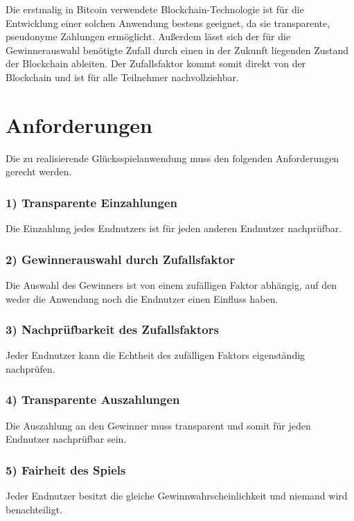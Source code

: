 \noindent Die erstmalig in Bitcoin verwendete Blockchain-Technologie ist für die Entwicklung einer solchen Anwendung bestens geeignet, da sie transparente, pseudonyme Zahlungen ermöglicht. Außerdem lässt sich der für die Gewinnerauswahl benötigte Zufall durch einen in der Zukunft liegenden Zustand der Blockchain ableiten. 
Der Zufallsfaktor kommt somit direkt von der Blockchain und ist für alle Teilnehmer nachvollziehbar.



\section{Anforderungen}\label{anforderungen}
Die zu realisierende Glücksspielanwendung muss den folgenden Anforderungen gerecht werden.
\subsubsection{1) Transparente Einzahlungen}
Die Einzahlung jedes Endnutzers ist für jeden anderen Endnutzer nachprüfbar.
\subsubsection{2) Gewinnerauswahl durch Zufallsfaktor}
Die Auswahl des Gewinners ist von einem zufälligen Faktor abhängig, auf den weder die Anwendung noch die Endnutzer einen Einfluss haben.
\subsubsection{3) Nachprüfbarkeit des Zufallsfaktors}
Jeder Endnutzer kann die Echtheit des zufälligen Faktors eigenständig nachprüfen.
\subsubsection{4) Transparente Auszahlungen}
Die Auszahlung an den Gewinner muss transparent und somit für jeden Endnutzer nachprüfbar sein.
\subsubsection{5) Fairheit des Spiels}
Jeder Endnutzer besitzt die gleiche Gewinnwahrscheinlichkeit und niemand wird benachteiligt.
\newpage
